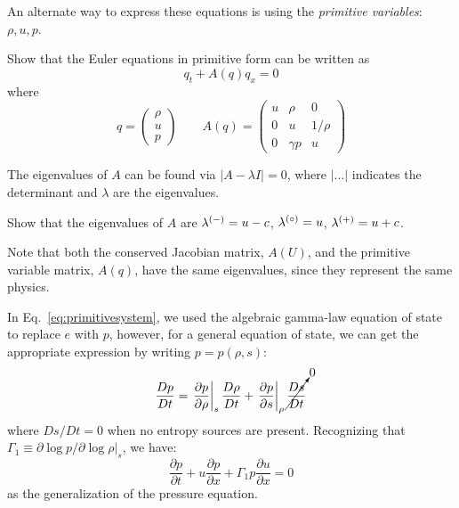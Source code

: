 An alternate way to express these equations is using the {\em
  primitive variables}: $\rho, u, p$.
\begin{exercise}
{Show that the Euler equations in primitive form can
  be written as
\begin{equation}
q_t + A(q) q_x = 0
\end{equation}
where
\begin{equation}
q = \left ( \begin{array}{c} \rho \\ u \\ p \end{array} \right )
%
\qquad
A(q) = \left ( \begin{array}{ccc} u  & \rho     & 0 \\
                                  0  &  u       & 1/\rho \\
                                  0  & \gamma p & u \end{array} \right )
\label{eq:primitivesystem}
\end{equation}
}
\end{exercise}
%
The eigenvalues of $A$ can be found via $| A - \lambda I | = 0$,
where $|\ldots|$ indicates the determinant and $\lambda$ are the eigenvalues.
\begin{exercise}
{
Show that the eigenvalues of $A$ are $\lambda^{(-)} = u -c$, $\lambda^{(\circ)} = u$, $\lambda^{(+)} = u+c$.
}
\end{exercise}
Note that both the conserved Jacobian matrix, $A(U)$, and the
primitive variable matrix, $A(q)$, have the same eigenvalues,
 since they represent the same physics.

In Eq.~\ref{eq:primitivesystem}, we used the algebraic gamma-law
equation of state to replace $e$ with $p$, however, for a general
equation of state, we can get the appropriate expression by writing $p
= p(\rho, s)$:
\begin{equation}
\frac{Dp}{Dt} = \left . \frac{\partial p}{\partial \rho} \right |_s
     \frac{D\rho}{Dt} +
     \left . \frac{\partial p}{\partial s} \right |_\rho
     \cancelto{0}{\frac{Ds}{Dt}}
\end{equation}
where $Ds/Dt = 0$ when no entropy sources are present.  Recognizing
that $\Gamma_1 \equiv \partial \log p/\partial \log \rho |_s$, we have:
\begin{equation}
\frac{\partial p}{\partial t} + u \frac{\partial p}{\partial x}
  + \Gamma_1 p \frac{\partial u}{\partial x} = 0  \label{eq:euler:pgeneral}
\end{equation}
as the generalization of the pressure equation.

